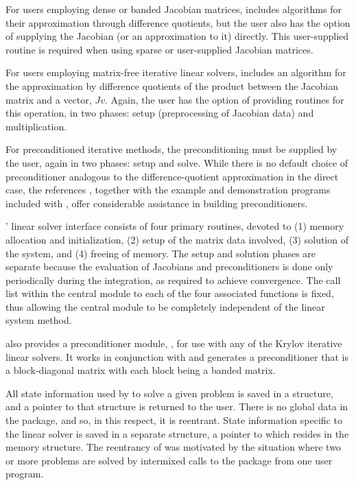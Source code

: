 For users employing dense or banded Jacobian matrices, {\idals}
includes algorithms for their approximation through difference 
quotients, but the user also has the option of supplying the Jacobian
(or an approximation to it) directly.  This user-supplied 
routine is required when using sparse or user-supplied Jacobian
matrices. 

For users employing matrix-free iterative linear solvers, {\idals}
includes an algorithm for the approximation by difference quotients of
the product between the Jacobian matrix and a vector, $Jv$. Again, the
user has the option of providing routines for this operation, in two
phases: setup (preprocessing of Jacobian data) and multiplication.

For preconditioned iterative methods,  
the preconditioning must be supplied by the user, again in two phases: 
setup and solve.  While there is no
default choice of preconditioner analogous to the difference-quotient
approximation in the direct case, the references
\cite{BrHi:89,Byr:92}, together with the example and demonstration
programs included with {\idas}, offer considerable assistance in
building preconditioners. 

{\idas}' linear solver interface consists of four primary routines,
devoted to (1) memory allocation and initialization, (2) setup of the
matrix data involved, (3) solution of the system, and (4) freeing of memory.  
The setup and solution phases are separate because the evaluation of
Jacobians and preconditioners is done only periodically during the
integration, as required to achieve convergence. The call list within
the central {\idas} module to each of the four associated functions is
fixed, thus allowing the central module to be completely independent
of the linear system method.

{\idas} also provides a preconditioner module, {\idabbdpre}, for use
with any of the Krylov iterative linear solvers.  It works in
conjunction with {\nvecp} and generates a preconditioner that is a
block-diagonal matrix with each block being a banded matrix.

All state information used by {\idas} to solve a given problem is saved
in a structure, and a pointer to that structure is returned to the
user.  There is no global data in the {\idas} package, and so, in this
respect, it is reentrant. State information specific to the linear
solver is saved in a separate structure, a pointer to which resides in
the {\idas} memory structure. The reentrancy of {\idas} was motivated
by the situation where two or more problems are solved by
intermixed calls to the package from one user program.

